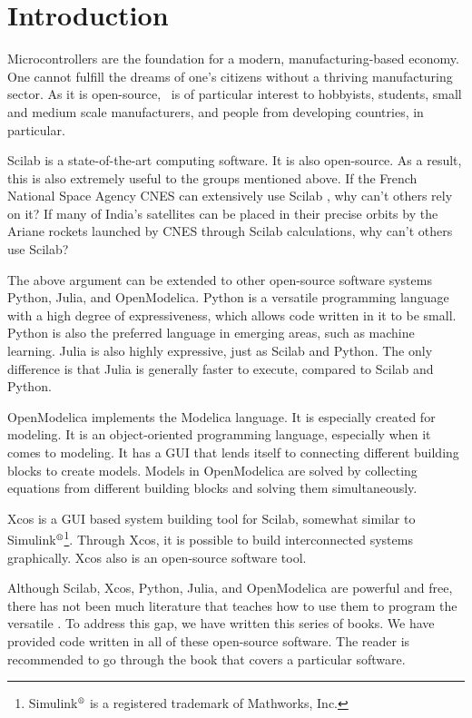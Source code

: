 \chapter{Introduction}
\thispagestyle{empty}
\label{sec:intro}
Microcontrollers are the foundation for a modern, manufacturing-based
economy. One cannot fulfill the dreams of one's citizens without a
thriving manufacturing sector. As it is open-source, \arduino\ is of
particular interest to hobbyists, students, small and medium scale
manufacturers, and people from developing countries, in particular.

Scilab is a state-of-the-art computing software. It is also open-source. As a result, this is also extremely useful to the groups
mentioned above. If the French National Space Agency CNES can
extensively use Scilab \cite{CNES-Scilab}, why can't others rely on
it? If many of India's satellites can be placed in their precise
orbits by the Ariane rockets launched by CNES through Scilab
calculations, why can't others use Scilab?

The above argument can be extended to other open-source software
systems Python, Julia, and OpenModelica. Python is a versatile
programming language with a high degree of expressiveness, which
allows code written in it to be small. Python is also the preferred
language in emerging areas, such as machine learning. Julia is also
highly expressive, just as Scilab and Python. The only difference is
that Julia is generally faster to execute, compared to Scilab and
Python.

OpenModelica implements the Modelica language. It is especially
created for modeling. It is an object-oriented programming language,
especially when it comes to modeling. It has a GUI that lends itself
to connecting different building blocks to create models. Models in
OpenModelica are solved by collecting equations from different
building blocks and solving them simultaneously.

Xcos is a GUI based system building tool for Scilab, somewhat similar
to
Simulink$^{\text{\textregistered}}$\footnote{Simulink$^{\text{\textregistered}}$
  is a registered trademark of Mathworks, Inc.}. Through Xcos, it is
possible to build interconnected systems graphically. Xcos also is an
open-source software tool.

Although Scilab, Xcos, Python, Julia, and OpenModelica are powerful and
free, there has not been much literature that teaches how to use them
to program the versatile \arduino. To address this gap, we have
written this series of books. We have provided code written in all of
these open-source software. The reader is recommended to go through
the book that covers a particular software.

